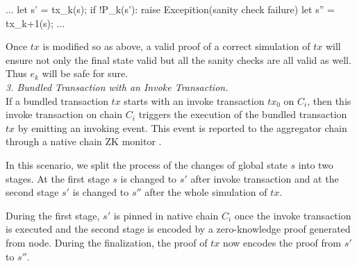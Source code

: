 \begin{code}
...
let s' = tx_k(s);
if !P_k(s'):
    raise Excepition(sanity check failure)
let s'' = tx_{k+1}(s);
...
\end{code}
Once $tx$ is modified so as above, a valid proof of a correct simulation of $tx$ will ensure not only the final state valid but all the sanity checks are all valid as well. Thus $e_k$ will be safe for sure.\\

\noindent\smallskip\emph{3. Bundled Transaction with an Invoke Transaction.}\\
If a bundled transaction $tx$ starts with an invoke transaction $tx_0$ on $C_i$, then this invoke transaction on chain $C_i$ triggers the execution of the bundled transaction $tx$ by emitting an invoking event. This event is reported to the aggregator chain through a native chain ZK monitor \cite{garoffolo2020zendoo}.


In this scenario, we split the process of the changes of global state $s$ into two stages. At the first stage $s$ is changed to $s'$ after invoke transaction and at the second stage $s'$ is changed to $s''$ after the whole simulation of $tx$.

During the first stage, $s'$ is pinned in native chain $C_i$ once the invoke transaction is executed and the second stage is encoded by a zero-knowledge proof generated from \dprotocol node. During the finalization, the proof of $tx$ now encodes the proof from $s'$ to $s''$.


